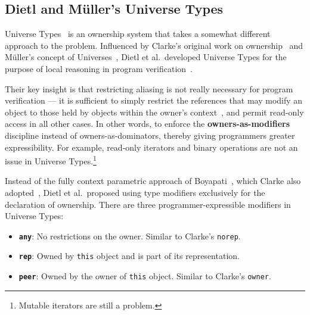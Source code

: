 \documentclass{acm_proc_article-sp}
\begin{document}

%

\subsection{Dietl and M\"{u}ller's Universe Types}
\label{subsec:dietl}

Universe Types~\cite{cunningham08ut} is an ownership system that takes a
somewhat different approach to the problem. Influenced by Clarke's original
work on ownership~\cite{clarke98ownership} and M\"{u}ller's concept of
Universes~\cite{muller99universes}, Dietl et al.\ developed Universe Types for
the purpose of local reasoning in program verification~\cite{cunningham08ut,
dietl09gut, dietl11gut}.

Their key insight is that restricting aliasing is not really necessary for
program verification --- it is sufficient to simply restrict the references
that may modify an object to those held by objects within the owner's
context~\cite{dietl11gut}, and permit read-only access in all other cases. In
other words, to enforce the \textbf{owners-as-modifiers} discipline instead of
owners-as-dominators, thereby giving programmers greater expressibility. For
example, read-only iterators and binary operations are not an issue in Universe
Types.\footnote{Mutable iterators are still a problem.}

Instead of the fully context parametric approach of
Boyapati~\cite{boyapati04safejava}, which Clarke also
adopted~\cite{clarke03ownership}, Dietl et al.\ proposed using type modifiers
exclusively for the declaration of ownership. There are three
programmer-expressible modifiers in Universe Types: \newpage
\begin{itemize}
	\item \textbf{\lstinline|any|}:
		No restrictions on the owner. Similar to Clarke's \lstinline|norep|.
	\item \textbf{\lstinline|rep|}:
		Owned by \lstinline|this| object and is part of its representation.
	\item \textbf{\lstinline|peer|}:
		Owned by the owner of \lstinline|this| object. Similar to Clarke's
		\lstinline|owner|.
\end{itemize}
\end{document}
